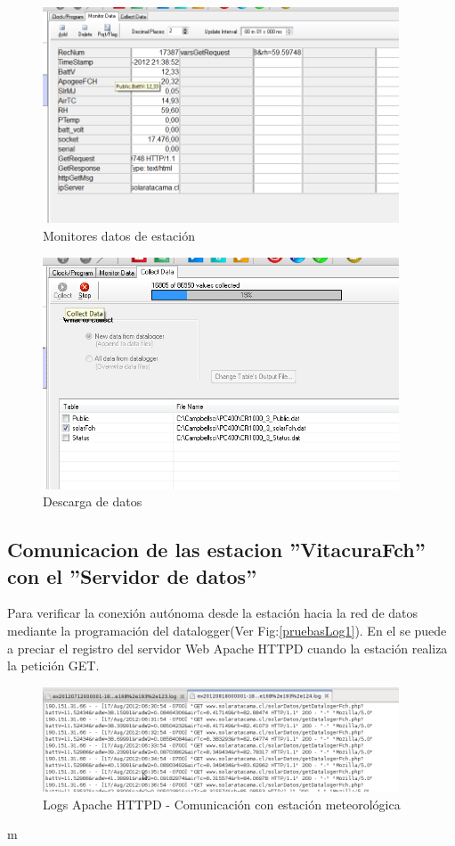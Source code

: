 \begin{figure}[h!]
        \centering
        \includegraphics[width=300pt]{images/pruebas4}
        \caption{Monitores datos de estación}
        \label{pruebas4}
\end{figure}
\begin{figure}[h!]
        \centering
        \includegraphics[width=300pt]{images/pruebas5}
        \caption{Descarga de datos}
        \label{pruebas5}
\end{figure}

\subsection{Comunicacion de las estacion ''VitacuraFch'' con el ''Servidor de datos''}
Para verificar la conexión autónoma desde la estación hacia la red de datos mediante la programación del datalogger(Ver Fig:\ref{pruebasLog1}). En el se puede a preciar el registro del servidor Web Apache HTTPD cuando la estación realiza la petición GET.

\begin{figure}[h!]
        \centering
        \includegraphics[width=300pt]{images/pruebasLog1}
        \caption{Logs Apache HTTPD - Comunicación con estación meteorológica}
        \label{prubasLog1}
\end{figure}m

